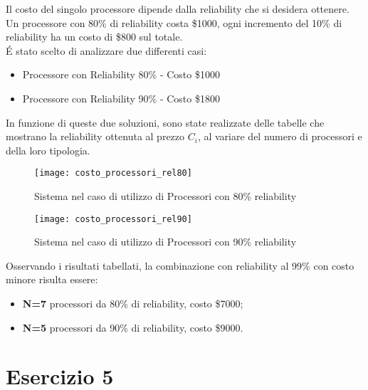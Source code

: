Il costo del singolo processore dipende dalla reliability che si desidera ottenere.\\
Un processore con 80\% di reliability costa \$1000, ogni incremento del 10\% di
reliability ha un costo di \$800 sul totale.\\
\'E stato scelto di analizzare due differenti casi:
\begin{itemize}
  \item Processore con Reliability 80\% - Costo \$1000
  \item Processore con Reliability 90\% - Costo \$1800
\end{itemize}

\clearpage

In funzione di queste due soluzioni, sono state realizzate delle tabelle che
mostrano la reliability ottenuta al prezzo $C_i$, al variare del numero di processori
e della loro tipologia.\\

\begin{figure}[!htbp]
  \centering
  \texttt{[image: costo\_processori\_rel80]}
  \caption{Sistema nel caso di utilizzo di Processori con 80\% reliability}
  \label{dep_costo_processori_rel80}
\end{figure}

\begin{figure}[!htbp]
  \centering
  \texttt{[image: costo\_processori\_rel90]}
  \caption{Sistema nel caso di utilizzo di Processori con 90\% reliability}
  \label{dep_costo_processori_rel90}
\end{figure}

Osservando i risultati tabellati, la combinazione con reliability al 99\% con
costo minore risulta essere:
\begin{itemize}
  \item \textbf{N=7} processori da 80\% di reliability, costo \$7000;
  \item \textbf{N=5} processori da 90\% di reliability, costo \$9000.
\end{itemize}

\clearpage

\section{Esercizio 5}
